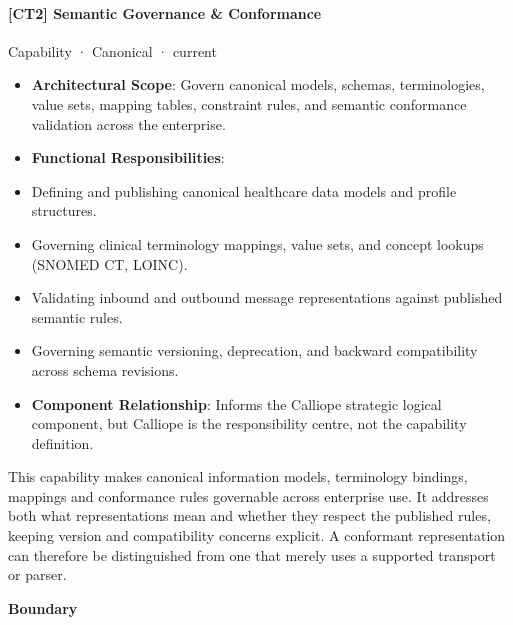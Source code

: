 \paragraph{[CT2] Semantic Governance \& Conformance}

\label{element:9ee41437bd4c4bd18389f05c12108f97}
{\small Capability · Canonical · current}\par

\begin{itemize}


\item \textbf{Architectural Scope}: Govern canonical models, schemas, terminologies, value sets, mapping tables, constraint rules, and semantic conformance validation across the enterprise.

\item \textbf{Functional Responsibilities}:

\item Defining and publishing canonical healthcare data models and profile structures.

\item Governing clinical terminology mappings, value sets, and concept lookups (SNOMED CT, LOINC).

\item Validating inbound and outbound message representations against published semantic rules.

\item Governing semantic versioning, deprecation, and backward compatibility across schema revisions.

\item \textbf{Component Relationship}: Informs the Calliope strategic logical component, but Calliope is the responsibility centre, not the capability definition.

\end{itemize}


This capability makes canonical information models, terminology bindings, mappings and conformance rules governable across enterprise use. It addresses both what representations mean and whether they respect the published rules, keeping version and compatibility concerns explicit. A conformant representation can therefore be distinguished from one that merely uses a supported transport or parser.



\textbf{Boundary}



